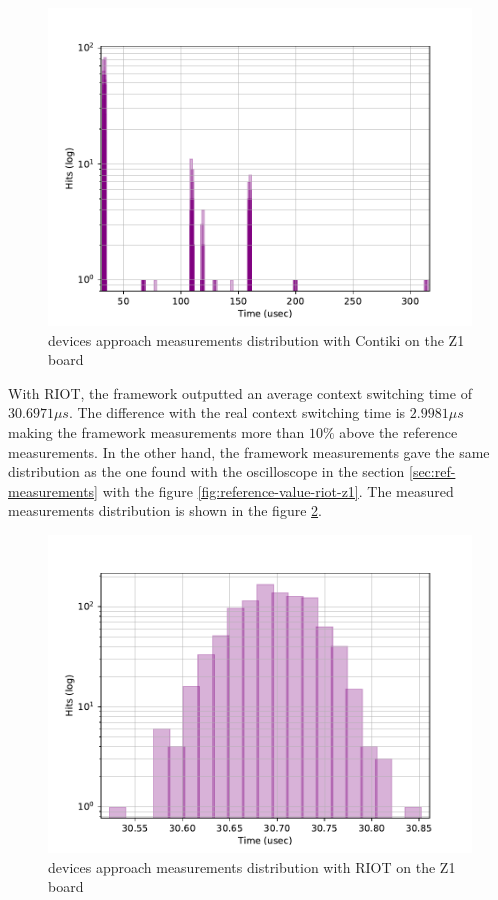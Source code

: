 \begin{figure}[!ht]
      \centering
      \includegraphics[scale=.7]{assets/devices-framework-contiki-z1.pdf}
      \caption{devices approach measurements distribution with Contiki on the Z1 board\label{fig:devices-framework-contiki-z1}}
\end{figure}

With RIOT, the framework outputted an average context switching time of $30.6971\mu s$.
The difference with the real context switching time is $2.9981\mu s$ making the framework measurements more than $10\%$ above the reference measurements.
In the other hand, the framework measurements gave the same distribution as the one found with the oscilloscope in the section \ref{sec:ref-measurements} with the figure \ref{fig:reference-value-riot-z1}.
The measured measurements distribution is shown in the figure \ref{fig:devices-framework-riot-z1}.

\begin{figure}[!ht]
      \centering
      \includegraphics[scale=.7]{assets/devices-framework-riot-z1.pdf}
      \caption{devices approach measurements distribution with RIOT on the Z1 board\label{fig:devices-framework-riot-z1}}
\end{figure}


